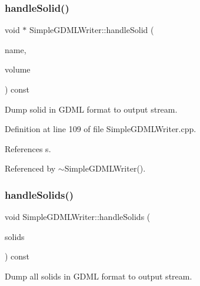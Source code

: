 \subsubsection{\texorpdfstring{handle\+Solid()}{handleSolid()}}
{\footnotesize\ttfamily void $\ast$ Simple\+G\+D\+M\+L\+Writer\+::handle\+Solid (\begin{DoxyParamCaption}\item[{const std\+::string \&}]{name,  }\item[{const T\+Geo\+Shape $\ast$}]{volume }\end{DoxyParamCaption}) const\hspace{0.3cm}{\ttfamily [virtual]}}



Dump solid in G\+D\+ML format to output stream. 



Definition at line 109 of file Simple\+G\+D\+M\+L\+Writer.\+cpp.



References s.



Referenced by $\sim$\+Simple\+G\+D\+M\+L\+Writer().

\hypertarget{class_d_d4hep_1_1_geometry_1_1_simple_g_d_m_l_writer_a5131f9aae36a36034d1cd9d7c783dba9}{}\label{class_d_d4hep_1_1_geometry_1_1_simple_g_d_m_l_writer_a5131f9aae36a36034d1cd9d7c783dba9} 
\subsubsection{\texorpdfstring{handle\+Solids()}{handleSolids()}}
{\footnotesize\ttfamily void Simple\+G\+D\+M\+L\+Writer\+::handle\+Solids (\begin{DoxyParamCaption}\item[{const \hyperlink{class_d_d4hep_1_1_geometry_1_1_geo_handler_types_a85d065cdf670a4f9ea9c0c4dee921fce}{Solid\+Set} \&}]{solids }\end{DoxyParamCaption}) const\hspace{0.3cm}{\ttfamily [virtual]}}



Dump all solids in G\+D\+ML format to output stream. 



